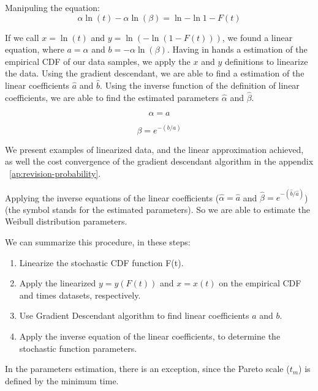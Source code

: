 Manipuling the equation:
\begin{equation}
\alpha\ln{(t)} - \alpha\ln{(\beta)} = \ln{-\ln{1 - F(t)}}
\end{equation}

If we call $x = \ln{(t)}$ and $y = \ln{(-\ln{(1 - F(t))})}$, we found a linear equation, where $a = \alpha$ and $b = -\alpha\ln{(\beta)}$. Having in hands a estimation of the empirical CDF of our data samples, we apply the $x$ and $y$ definitions to linearize the data. Using the gradient descendant, we are able to find a estimation of the linear coefficients $\hat{a}$ and $\hat{b}$. Using the inverse function of the definition of linear coefficients, we are able to find the estimated parameters $\hat{\alpha}$ and $\hat{\beta}$.

\begin{equation}
\alpha = a
\end{equation}

\begin{equation}
\beta = e^{-(b/a)}
\end{equation}

We present examples of linearized data, and the linear approximation achieved, as well the cost convergence of the gradient descendant algorithm in the appendix ~\ref{ap:revision-probability}.

Applying the inverse equations of the linear coefficients ($\hat{\alpha} = \hat{a}$ and $\hat{\beta} = e^{-(\hat{b}/\hat{a})}$) (the symbol stands for the estimated parameters). So we are able to estimate the Weibull distribution parameters.

We can summarize this procedure, in these steps:
\begin{enumerate}
\item Linearize the stochastic CDF function F(t).
\item Apply the linearized $y = y(F(t))$ and  $x = x(t)$ on the empirical CDF and times datasets, respectively. 
\item Use Gradient Descendant algorithm to find linear coefficients $a$ and $b$.
\item Apply the inverse equation of the linear coefficients, to determine the stochastic function parameters.
\end{enumerate}

In the parameters estimation, there is an exception, since the Pareto scale ($t_{m}$) is defined by the minimum time. 

